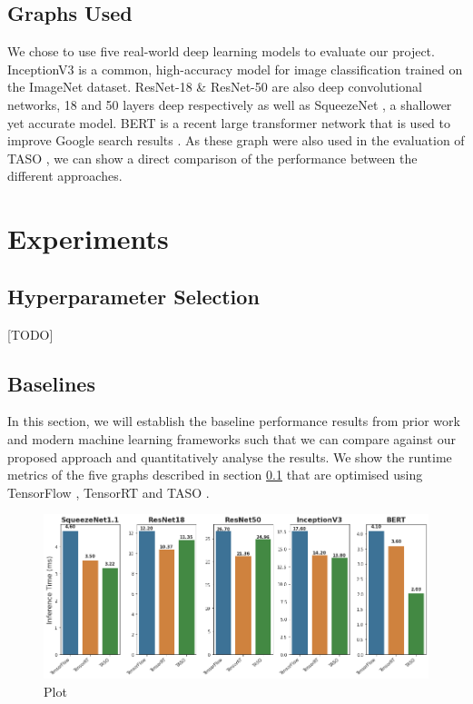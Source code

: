 \subsection{Graphs Used}
\label{sec:eval:subsec:graphsused}

We chose to use five real-world deep learning models to evaluate our project. InceptionV3 \cite{szegedy2015rethinking} is a common, high-accuracy model for image classification trained on the ImageNet dataset. ResNet-18 \& ResNet-50 \cite{he2015deep} are also deep convolutional networks, 18 and 50 layers deep respectively as well as SqueezeNet \cite{iandola2016squeezenet}, a shallower yet accurate model. BERT \cite{devlin2019bert} is a recent large transformer network that is used to improve Google search results \cite{nayak2019}. As these graph were also used in the evaluation of TASO \cite{jia2019taso}, we can show a direct comparison of the performance between the different approaches.

\section{Experiments}

\subsection{Hyperparameter Selection}
[TODO]

\subsection{Baselines}

In this section, we will establish the baseline performance results from prior work and modern machine learning frameworks such that we can compare against our proposed approach and quantitatively analyse the results. We show the runtime metrics of the five graphs described in section \ref{sec:eval:subsec:graphsused} that are optimised using TensorFlow \cite{tensorflow2015-whitepaper}, TensorRT \cite{tensorrt2017} and TASO \cite{jia2019taso}.


\begin{figure}[ht]
  \centering
  \includegraphics[width=1\columnwidth]{sections/5evaluation/images/baseline_runtimes.png}
  \caption[Baseline runtimes of optimised graphs]{Plot}
  \label{fig:eval:baseline-runtimes}
\end{figure}

